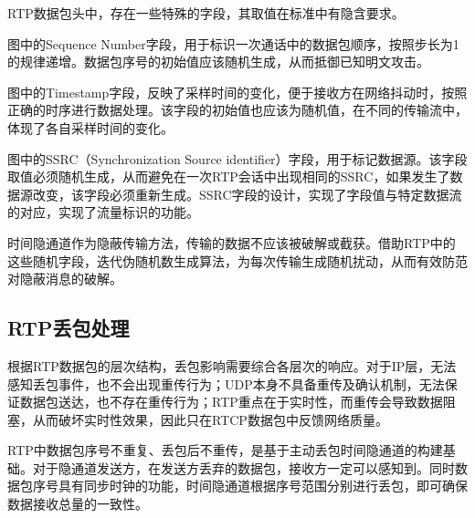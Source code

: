 RTP数据包头中，存在一些特殊的字段，其取值在标准中有隐含要求。

图中的{Sequence Number}字段，用于标识一次通话中的数据包顺序，按照步长为1的规律递增。数据包序号的初始值应该随机生成，从而抵御已知明文攻击。

图中的{Timestamp}字段，反映了采样时间的变化，便于接收方在网络抖动时，按照正确的时序进行数据处理。该字段的初始值也应该为随机值，在不同的传输流中，体现了各自采样时间的变化。

图中的{SSRC}（{Synchronization Source identifier}）字段，用于标记数据源。该字段取值必须随机生成，从而避免在一次RTP会话中出现相同的{SSRC}，如果发生了数据源改变，该字段必须重新生成。{SSRC}字段的设计，实现了字段值与特定数据流的对应，实现了流量标识的功能。

时间隐通道作为隐蔽传输方法，传输的数据不应该被破解或截获。借助RTP中的这些随机字段，迭代伪随机数生成算法，为每次传输生成随机扰动，从而有效防范对隐蔽消息的破解。

\subsection{RTP丢包处理}
\label{chap:backinfo:rtp:dropout}

根据RTP数据包的层次结构，丢包影响需要综合各层次的响应。对于IP层，无法感知丢包事件，也不会出现重传行为；UDP本身不具备重传及确认机制，无法保证数据包送达，也不存在重传行为；RTP重点在于实时性，而重传会导致数据阻塞，从而破坏实时性效果，因此只在RTCP数据包中反馈网络质量。

RTP中数据包序号不重复、丢包后不重传，是基于主动丢包时间隐通道的构建基础。对于隐通道发送方，在发送方丢弃的数据包，接收方一定可以感知到。同时数据包序号具有同步时钟的功能，时间隐通道根据序号范围分别进行丢包，即可确保数据接收总量的一致性。